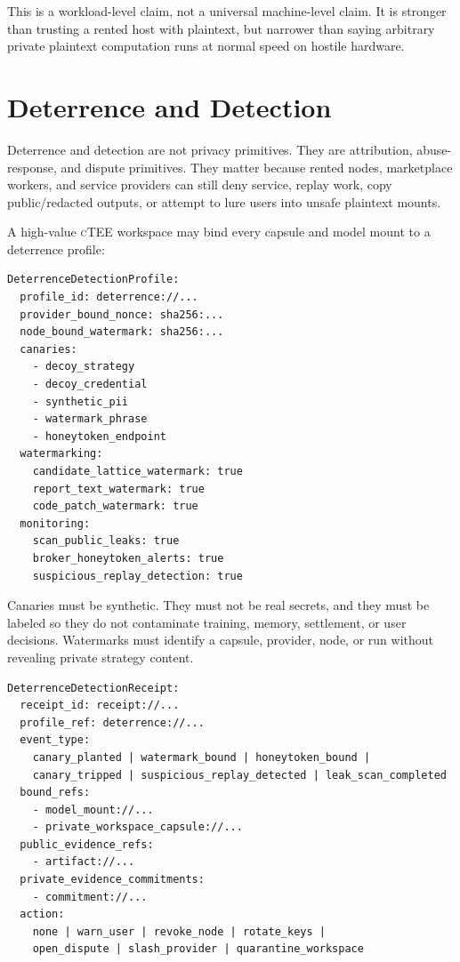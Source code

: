 \documentclass[11pt]{article}
\newcommand{\ctee}{\textnormal{\textsc{cTEE}}}
\begin{document}
This is a workload-level claim, not a universal machine-level claim. It is
stronger than trusting a rented host with plaintext, but narrower than saying
arbitrary private plaintext computation runs at normal speed on hostile
hardware.

\section{Deterrence and Detection}

Deterrence and detection are not privacy primitives. They are attribution,
abuse-response, and dispute primitives. They matter because rented nodes,
marketplace workers, and service providers can still deny service, replay
work, copy public/redacted outputs, or attempt to lure users into unsafe
plaintext mounts.

A high-value \ctee{} workspace may bind every capsule and model mount to a
deterrence profile:

\begin{Verbatim}[fontsize=\small]
DeterrenceDetectionProfile:
  profile_id: deterrence://...
  provider_bound_nonce: sha256:...
  node_bound_watermark: sha256:...
  canaries:
    - decoy_strategy
    - decoy_credential
    - synthetic_pii
    - watermark_phrase
    - honeytoken_endpoint
  watermarking:
    candidate_lattice_watermark: true
    report_text_watermark: true
    code_patch_watermark: true
  monitoring:
    scan_public_leaks: true
    broker_honeytoken_alerts: true
    suspicious_replay_detection: true
\end{Verbatim}

Canaries must be synthetic. They must not be real secrets, and they must be
labeled so they do not contaminate training, memory, settlement, or user
decisions. Watermarks must identify a capsule, provider, node, or run without
revealing private strategy content.

\begin{Verbatim}[fontsize=\small]
DeterrenceDetectionReceipt:
  receipt_id: receipt://...
  profile_ref: deterrence://...
  event_type:
    canary_planted | watermark_bound | honeytoken_bound |
    canary_tripped | suspicious_replay_detected | leak_scan_completed
  bound_refs:
    - model_mount://...
    - private_workspace_capsule://...
  public_evidence_refs:
    - artifact://...
  private_evidence_commitments:
    - commitment://...
  action:
    none | warn_user | revoke_node | rotate_keys |
    open_dispute | slash_provider | quarantine_workspace
\end{Verbatim}
\end{document}
